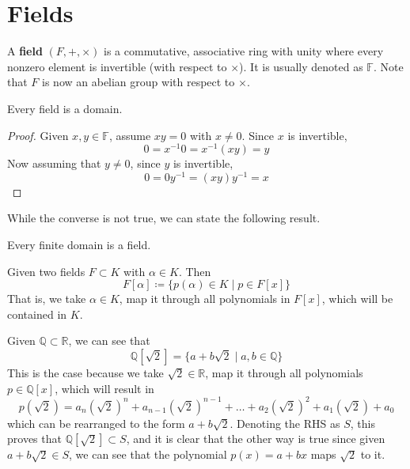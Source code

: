 \section{Fields}

  \begin{definition}[Field]
    A \textbf{field} $(F, +, \times)$ is a commutative, associative ring with unity where every nonzero element is invertible (with respect to $\times$). It is usually denoted as $\mathbb{F}$. Note that $F$ is now an abelian group with respect to $\times$. 
  \end{definition}

  \begin{proposition}
    Every field is a domain. 
  \end{proposition}
  \begin{proof}
    Given $x, y \in \mathbb{F}$, assume $x y = 0$ with $x \neq 0$. Since $x$ is invertible,
    \begin{equation}
      0 = x^{-1} 0 = x^{-1} (x y) = y
    \end{equation}
    Now assuming that $y \neq 0$, since $y$ is invertible, 
    \begin{equation}
      0 = 0 y^{-1} = (x y) y^{-1} = x
    \end{equation}
  \end{proof}

  While the converse is not true, we can state the following result. 

  \begin{theorem}
    Every finite domain is a field. 
  \end{theorem} 

  \begin{definition}
    Given two fields $F \subset K$ with $\alpha \in K$. Then 
    \begin{equation}
      F[\alpha] \coloneqq \{p(\alpha) \in K \mid p \in F[x]\}
    \end{equation}
    That is, we take $\alpha \in K$, map it through all polynomials in $F[x]$, which will be contained in $K$. 
  \end{definition}

  \begin{example}
    Given $\mathbb{Q} \subset \mathbb{R}$, we can see that 
    \begin{equation}
      \mathbb{Q}[\sqrt{2}] = \{a + b \sqrt{2} \mid a, b \in \mathbb{Q} \}
    \end{equation}
    This is the case because we take $\sqrt{2} \in \mathbb{R}$, map it through all polynomials $p \in \mathbb{Q}[x]$, which will result in 
    \begin{equation}
      p(\sqrt{2}) = a_n (\sqrt{2})^n + a_{n-1} (\sqrt{2})^{n-1} + \ldots + a_2 (\sqrt{2})^2 + a_1 (\sqrt{2}) + a_0 
    \end{equation}
    which can be rearranged to the form $a + b\sqrt{2}$. Denoting the RHS as $S$, this proves that $\mathbb{Q}[\sqrt{2}] \subset S$, and it is clear that the other way is true since given $a + b \sqrt{2} \in S$, we can see that the polynomial $p(x) = a + b x$ maps $\sqrt{2}$ to it. 
  \end{example}

